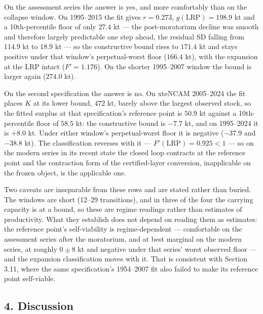 On the assessment series the answer is yes, and more comfortably than on the
collapse window. On 1995--2015 the fit gives \(r = 0.273\),
\(g(\mathrm{LRP}) = 198.9\) kt and a 10th-percentile floor of only
\(27.4\) kt --- the post-moratorium decline was smooth and therefore largely
predictable one step ahead, the residual SD falling from \(114.9\) kt to
\(18.9\) kt --- so the constructive bound rises to \(171.4\) kt and stays
positive under that window's perpetual-worst floor (\(166.4\) kt), with the
expansion at the LRP intact (\(F' = 1.176\)). On the shorter 1995--2007
window the bound is larger again (\(274.0\) kt).

On the second specification the answer is no. On xteNCAM 2005--2024 the fit
places \(K\) at its lower bound, \(472\) kt, barely above the largest
observed stock, so the fitted surplus at that specification's reference point
is \(50.9\) kt against a 10th-percentile floor of \(58.5\) kt: the
constructive bound is \(-7.7\) kt, and on 1995--2024 it is \(+8.0\) kt.
Under either window's perpetual-worst floor it is negative (\(-37.9\) and
\(-38.8\) kt). The classification reverses with it ---
\(F'(\mathrm{LRP}) = 0.925 < 1\) --- so on the modern series in its recent
state the closed loop contracts at the reference point and the contraction form
of the certified-layer conversion, inapplicable on the frozen object, is the
applicable one.

Two caveats are inseparable from these rows and are stated rather than buried.
The windows are short (12--29 transitions), and in three of the four the
carrying capacity is at a bound, so these are regime readings rather than
estimates of productivity. What they establish does not depend on reading them
as estimates: the reference point's self-viability is regime-dependent ---
comfortable on the assessment series after the moratorium, and at best marginal
on the modern series, at roughly \(0 \pm 8\) kt and negative under that
series' worst observed floor --- and the expansion classification moves with
it. That is consistent with Section 3.11, where the same specification's
1954--2007 fit also failed to make its reference point self-viable.

\subsection{4. Discussion}\label{budget-discussion}

